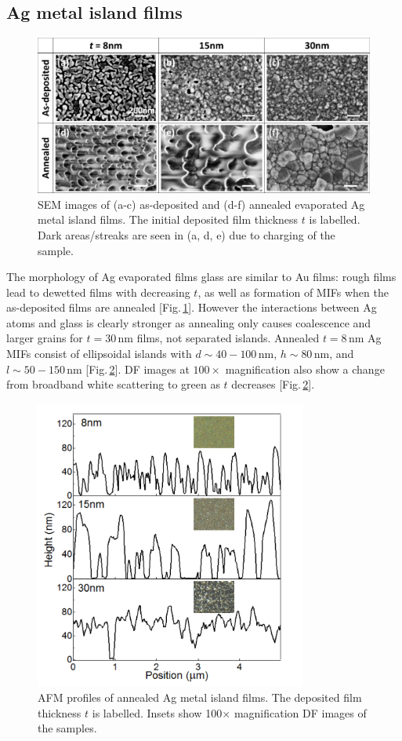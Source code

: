 \subsection{Ag metal island films}
\begin{figure}[h!] 
\centering    
\includegraphics[width=\textwidth]{Fig4}
\caption{SEM images of (a-c) as-deposited and (d-f) annealed evaporated Ag metal island films. The initial deposited film thickness $t$ is labelled. Dark areas/streaks are seen in (a, d, e) due to charging of the sample.}
\label{6Fig4}
\end{figure}
The morphology of Ag evaporated films glass are similar to Au films: rough films lead to dewetted films with decreasing $t$, as well as formation of MIFs when the as-deposited films are annealed [Fig.\,\ref{6Fig4}]. However the interactions between Ag atoms and glass is clearly stronger as annealing only causes coalescence and larger grains for $t=30$\,nm films, not separated islands. Annealed $t=8$\,nm Ag MIFs consist of ellipsoidal islands with $d \sim40-100$\,nm, $h\sim80$\,nm, and $l\sim50-150$\,nm [Fig.\,\ref{6Fig5}]. DF images at $100\times$ magnification also show a change from broadband white scattering to green as $t$ decreases [Fig.\,\ref{6Fig5}]. 

\begin{figure}[h!] 
\centering    
\includegraphics[width=0.8\textwidth]{Fig5}
\caption{AFM profiles of annealed Ag metal island films. The deposited film thickness $t$ is labelled. Insets show 100$\times$ magnification DF images of the samples.}
\label{6Fig5}
\end{figure}

